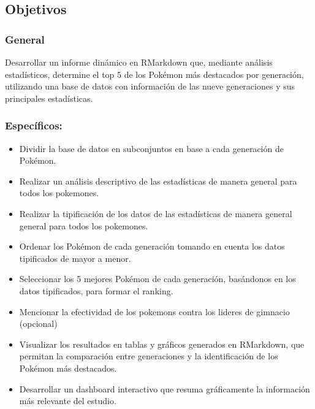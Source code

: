 \documentclass[
]{article}
\providecommand{\tightlist}{%
  \setlength{\itemsep}{0pt}\setlength{\parskip}{0pt}}
\begin{document}
\subsection{Objetivos}\label{objetivos}

\subsubsection{General}\label{general}

Desarrollar un informe dinámico en RMarkdown que, mediante análisis
estadísticos, determine el top 5 de los Pokémon más destacados por
generación, utilizando una base de datos con información de las nueve
generaciones y sus principales estadísticas.

\subsubsection{Específicos:}\label{especuxedficos}

\begin{itemize}
\tightlist
\item
  Dividir la base de datos en subconjuntos en base a cada generación de
  Pokémon.
\item
  Realizar un análisis descriptivo de las estadísticas de manera general
  para todos los pokemones.
\item
  Realizar la tipificación de los datos de las estadísticas de manera
  general general para todos los pokemones.
\item
  Ordenar los Pokémon de cada generación tomando en cuenta los datos
  tipificados de mayor a menor.
\item
  Seleccionar los 5 mejores Pokémon de cada generación, basándonos en
  los datos tipificados, para formar el ranking.
\item
  Mencionar la efectividad de los pokemons contra los lideres de
  gimnacio (opcional)
\item
  Visualizar los resultados en tablas y gráficos generados en RMarkdown,
  que permitan la comparación entre generaciones y la identificación de
  los Pokémon más destacados.
\item
  Desarrollar un dashboard interactivo que resuma gráficamente la
  información más relevante del estudio.
\end{itemize}
\end{document}
